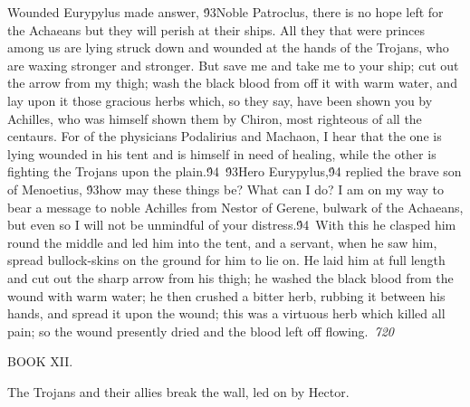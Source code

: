 {Wounded Eurypylus made answer, \'93Noble Patroclus, there is no hope left for the Achaeans but they will perish at their ships. All they that were princes among us are lying struck down and wounded at the hands of the Trojans, who are waxing stronger and stronger. But save me and take me to your ship; cut out the arrow from my thigh; wash the black blood from off it with warm water, and lay upon it those gracious herbs which, so they say, have been shown you by Achilles, who was himself shown them by Chiron, most righteous of all the centaurs. For of the physicians Podalirius and Machaon, I hear that the one is lying wounded in his tent and is himself in need of healing, while the other is fighting the Trojans upon the plain.\'94\
\'93Hero Eurypylus,\'94 replied the brave son of Menoetius, \'93how may these things be? What can I do? I am on my way to bear a message to noble Achilles from Nestor of Gerene, bulwark of the Achaeans, but even so I will not be unmindful of your distress.\'94\
With this he clasped him round the middle and led him into the tent, and a servant, when he saw him, spread bullock-skins on the ground for him to lie on. He laid him at full length and cut out the sharp arrow from his thigh; he washed the black blood from the wound with warm water; he then crushed a bitter herb, rubbing it between his hands, and spread it upon the wound; this was a virtuous herb which killed all pain; so the wound presently dried and the blood left off flowing.\
\pard{}\sl720\qc{}

\fs48 \cf2 BOOK XII.\
\pard\pardeftab720\li1710\ri1710\sa64\qj\partightenfactor0

  The Trojans and their allies break the wall, led on by Hector.\
\pard{}\qj{}

}
